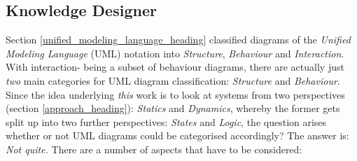 %
%
%
%
%
%
%

\subsection{Knowledge Designer}
\label{knowledge_designer_heading}

Section \ref{unified_modeling_language_heading} classified diagrams of the
\emph{Unified Modeling Language} (UML) notation into \emph{Structure},
\emph{Behaviour} and \emph{Interaction}. With interaction- being a subset of
behaviour diagrams, there are actually just \emph{two} main categories for UML
diagram classification: \emph{Structure} and \emph{Behaviour}. Since the idea
underlying \emph{this} work is to look at systems from two perspectives
(section \ref{approach_heading}): \emph{Statics} and \emph{Dynamics}, whereby
the former gets split up into two further perspectives: \emph{States} and
\emph{Logic}, the question arises whether or not UML diagrams could be
categorised accordingly? The answer is: \emph{Not quite.} There are a number of
aspects that have to be considered:

